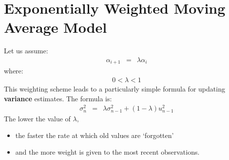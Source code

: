 \section{Exponentially Weighted Moving Average Model}
Let us assume:
\begin{eqnarray}
	\alpha_{i + 1} &=& \lambda\alpha_{i} 
\end{eqnarray}
where:
\begin{eqnarray}
	0 < \lambda < 1
\end{eqnarray}
This weighting scheme leads to a particularly simple formula for updating \textbf{\color{blue}variance} estimates. The formula is:
\begin{eqnarray}
	\sigma_{n}^{2} &=& \lambda\sigma_{n - 1}^{2} + (1 - \lambda)u_{n - 1}^{2}
\end{eqnarray}
The lower the value of $\lambda$,
\begin{itemize}
	\item the faster the rate at which old values are ‘forgotten’
	\item and the more weight is given to the most recent observations.
\end{itemize}


